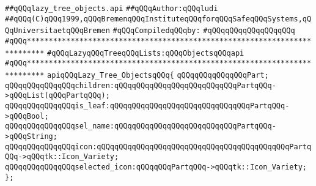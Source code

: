 \label{src/lib/tk/src/toolkit/lazy_tree_objects.api}
\verb|##qQQqlazy_tree_objects.api|\newline
\verb|##qQQqAuthor:qQQqludi|\newline
\verb|##qQQq(C)qQQq1999,qQQqBremenqQQqInstituteqQQqforqQQqSafeqQQqSystems,qQQqUniversitaetqQQqBremen|\newline
\newline
\verb|#qQQqCompiledqQQqby:|\newline
\verb|#qQQqqQQqqQQqqQQqqQQq|\newline
\newline
\newline
\newline
\verb|#qQQq**************************************************************************|\newline
\verb|#qQQqLazyqQQqTreeqQQqLists:qQQqObjectsqQQqapi|\newline
\verb|#qQQq**************************************************************************|\newline
\newline
\newline
\newline
\verb|apiqQQqLazy_Tree_ObjectsqQQq{|\newline
\newline
\verb|qQQqqQQqqQQqqQQqPart;|\newline
\newline
\verb|qQQqqQQqqQQqqQQqchildren:qQQqqQQqqQQqqQQqqQQqqQQqqQQqPartqQQq->qQQqList(qQQqPartqQQq);|\newline
\verb|qQQqqQQqqQQqqQQqis_leaf:qQQqqQQqqQQqqQQqqQQqqQQqqQQqqQQqPartqQQq->qQQqBool;|\newline
\verb|qQQqqQQqqQQqqQQqsel_name:qQQqqQQqqQQqqQQqqQQqqQQqqQQqPartqQQq->qQQqString;|\newline
\verb|qQQqqQQqqQQqqQQqicon:qQQqqQQqqQQqqQQqqQQqqQQqqQQqqQQqqQQqqQQqqQQqPartqQQq->qQQqtk::Icon_Variety;|\newline
\verb|qQQqqQQqqQQqqQQqselected_icon:qQQqqQQqPartqQQq->qQQqtk::Icon_Variety;|\newline
\verb|};|\newline
\newline

